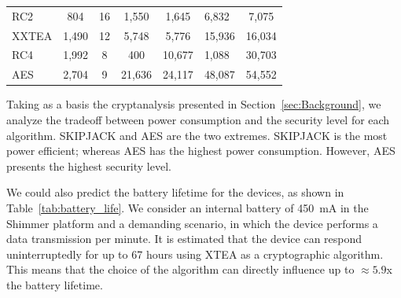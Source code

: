 \documentclass[journal]{IEEEtran}
\begin{document}
\begin{table}[h!]
\begin{tabular}{l|c|c|c|c|lc}
RC2         & 804       & 16        & 1,550     & 1,645     & \multicolumn{1}{l|}{6,832}        & 7,075  \\
XXTEA       & 1,490     & 12        & 5,748     & 5,776     & \multicolumn{1}{l|}{15,936}       & 16,034 \\
RC4         & 1,992     & 8         & 400       & 10,677    & \multicolumn{1}{l|}{1,088}        & 30,703 \\
AES         & 2,704     & 9         & 21,636    & 24,117    & \multicolumn{1}{l|}{48,087}       & 54,552 \\ \hline
\end{tabular}

\label{tab:instr}
\vspace{-0.2cm}
\end{table}

Taking as a basis the cryptanalysis presented in Section~\ref{sec:Background}, we analyze the tradeoff between power consumption and the  security level for each algorithm. SKIPJACK and AES are the two extremes. SKIPJACK is the most power efficient; whereas AES has the highest power consumption. However, AES presents the highest security level. 

We could also predict the battery lifetime for the devices, as shown in Table~\ref{tab:battery_life}. We consider an internal battery of 450~mA in the Shimmer platform and a demanding scenario, in which the device performs a data transmission per minute. It is estimated that the device can respond uninterruptedly for up to 67 hours using XTEA as a cryptographic algorithm. This means that the choice of the algorithm can directly influence up to $\approx 5.9$x the battery lifetime.
\end{document}
